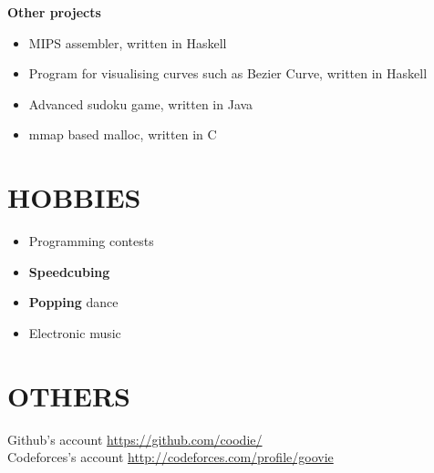 \documentclass[line]{res}
\begin{document}
\begin{resume}
\textbf{Other projects}
\begin{itemize}
\item{MIPS assembler, written in Haskell }
\item{Program for visualising curves such as Bezier Curve, written in Haskell}
\item{Advanced sudoku game, written in Java }
\item{mmap based malloc, written in C}
\end{itemize}

\section{HOBBIES}
\begin{itemize}
\item{Programming contests}
\item{\textbf{Speedcubing}}
\item{\textbf{Popping} dance}
\item{ Electronic music }
\end{itemize}

\section{OTHERS}
Github's account \url{https://github.com/coodie/}\\
Codeforces's account \url{http://codeforces.com/profile/goovie}

\vfill

\end{resume}
\end{document}
